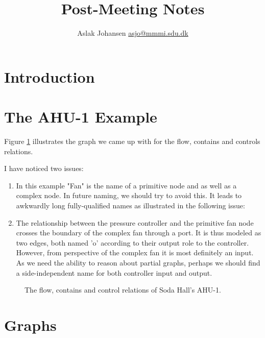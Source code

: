 \documentclass{article}
\title{Post-Meeting Notes\\\scalebox{.85}{from 23rd Mar, 2016}}
\author{Aslak Johansen \href{mailto:asjo@mmmi.sdu.dk}{asjo@mmmi.sdu.dk}}
\newcommand{\includeSVG}[1]{
  \texttt{[image: ./figs/\#1.pdf]}
}
\begin{document}
\maketitle
\tableofcontents
\newpage

\section{Introduction}

\section{The AHU-1 Example}

Figure \ref{fig:ahu1} illustrates the graph we came up with for the flow, contains and controls relations.

I have noticed two issues:
\begin{enumerate}
  \item In this example "Fan" is the name of a primitive node and as well as a complex node. In future naming, we should try to avoid this. It leads to awkwardly long fully-qualified names as illustrated in the following issue:
  \item The relationship between the pressure controller and the primitive fan node crosses the boundary of the complex fan through a port. It is thus modeled as two edges, both named 'o' according to their output role to the controller. However, from perspective of the complex fan it is most definitely an input. As we need the ability to reason about partial graphs, perhaps we should find a side-independent name for both controller input and output.
\end{enumerate}

\begin{figure}[tp]
  \begin{center}
    \scalebox{0.8}{\includeSVG{ahu1_from_writeboard}}
  \end{center}
  \caption{The flow, contains and control relations of Soda Hall's AHU-1.}
  \label{fig:ahu1}
\end{figure}

\section{Graphs}
\end{document}
